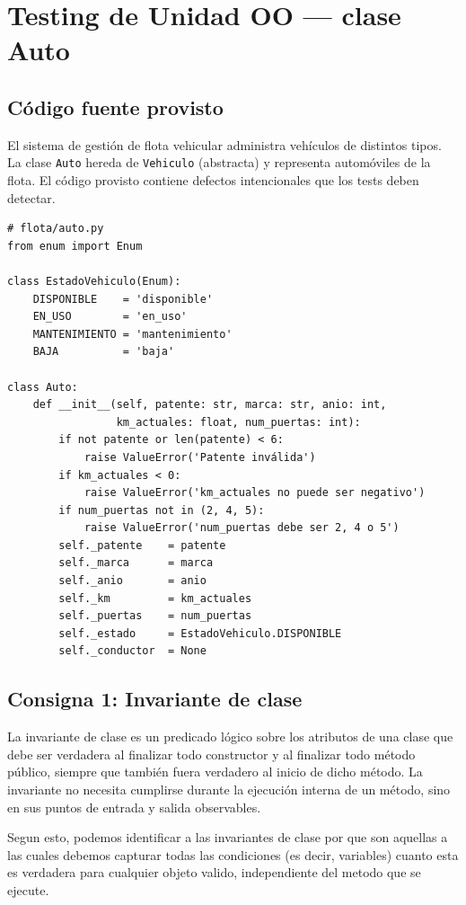 \section{Testing de Unidad OO --- clase Auto}

\subsection{Código fuente provisto}

El sistema de gestión de flota vehicular administra vehículos de distintos tipos. La clase \texttt{Auto} hereda de \texttt{Vehiculo} (abstracta) y representa automóviles de la flota. El código provisto contiene defectos intencionales que los tests deben detectar.

\begin{verbatim}
# flota/auto.py
from enum import Enum

class EstadoVehiculo(Enum):
    DISPONIBLE    = 'disponible'
    EN_USO        = 'en_uso'
    MANTENIMIENTO = 'mantenimiento'
    BAJA          = 'baja'

class Auto:
    def __init__(self, patente: str, marca: str, anio: int,
                 km_actuales: float, num_puertas: int):
        if not patente or len(patente) < 6:
            raise ValueError('Patente inválida')
        if km_actuales < 0:
            raise ValueError('km_actuales no puede ser negativo')
        if num_puertas not in (2, 4, 5):
            raise ValueError('num_puertas debe ser 2, 4 o 5')
        self._patente    = patente
        self._marca      = marca
        self._anio       = anio
        self._km         = km_actuales
        self._puertas    = num_puertas
        self._estado     = EstadoVehiculo.DISPONIBLE
        self._conductor  = None
\end{verbatim}

\subsection{Consigna 1: Invariante de clase}

La invariante de clase es un predicado lógico sobre los atributos de una clase que debe ser verdadera al finalizar todo constructor y al finalizar todo método público, siempre que también fuera verdadero al inicio de dicho método. La invariante no necesita cumplirse durante la ejecución interna de un método, sino en sus puntos de entrada y salida observables.

Segun esto, podemos identificar a las invariantes de clase por que son aquellas a las cuales debemos capturar todas las condiciones (es decir, variables) cuanto esta es verdadera para cualquier objeto valido, independiente del metodo que se ejecute.

